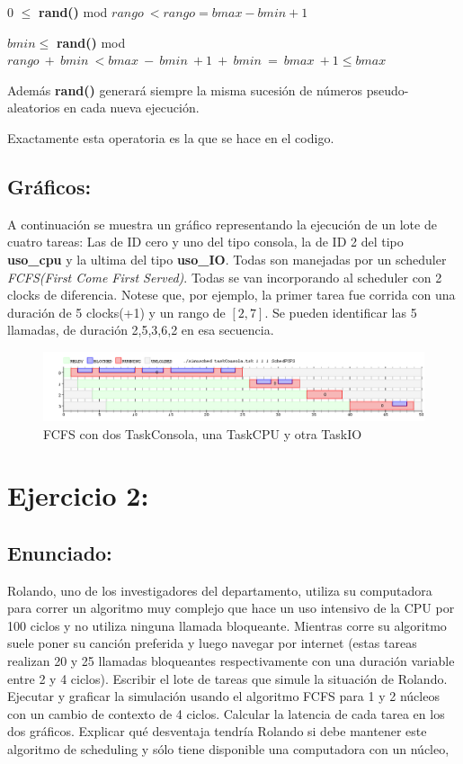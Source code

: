 \documentclass[10pt, a4paper]{article}
\begin{document}
$0$ \hspace{6mm}$\leq$  \hspace{5mm}\textbf{rand()} mod $rango \ < rango = bmax - bmin +1$ 

$bmin\leq$ \hspace{4mm} \textbf{rand()} mod $rango\ + \ bmin \ <  bmax \ - \ bmin \ +1 \ + \ bmin \ = \ bmax \ +1 \leq bmax$

Además \textbf{rand()} generará siempre la misma sucesión de números pseudo-aleatorios en cada nueva ejecución.

Exactamente esta operatoria es la que se hace en el codigo.
\subsection{Gráficos:}

A continuación se muestra un gráfico representando la ejecución de un lote de cuatro tareas: Las de ID cero y uno  del tipo consola, la de ID 2 del tipo \textbf{uso\_cpu} y la ultima del tipo \textbf{uso\_IO}. Todas son manejadas por un scheduler \textit{FCFS(First Come First Served)}. Todas se van incorporando al scheduler con 2 clocks de diferencia.
Notese que, por ejemplo, la primer tarea fue corrida con una duración de 5 clocks(+1) y un rango de $[2,7]$. Se pueden identificar las 5 llamadas, de duración 2,5,3,6,2 en esa secuencia.
\begin{figure}[H]
  	\centering
   	\includegraphics[width=1\textwidth]
   	 {imgs/ej1.png}
	\caption{FCFS con dos TaskConsola, una TaskCPU y otra TaskIO}
\end{figure}


\section{Ejercicio 2:}

\subsection{Enunciado:}Rolando, uno de los investigadores del departamento, utiliza su computadora
para correr un algoritmo muy complejo que hace un uso intensivo de la CPU por 100 ciclos
y no utiliza ninguna llamada bloqueante. Mientras corre su algoritmo suele poner su canción preferida y luego navegar por internet (estas tareas realizan 20 y 25 llamadas bloqueantes respectivamente con una duración variable entre 2 y 4 ciclos).
Escribir el lote de tareas que simule la situación de Rolando. Ejecutar y graficar la simulación usando el algoritmo FCFS para 1 y 2 núcleos con un cambio de contexto de 4 ciclos. Calcular la latencia de cada tarea en los dos gráficos. Explicar qué desventaja tendría Rolando si debe mantener este algoritmo de scheduling y sólo tiene disponible una computadora con un núcleo, 
\end{document}
